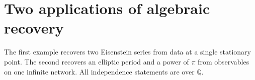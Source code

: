 \documentclass[11pt,a4paper]{article}
\theoremstyle{definition}\newtheorem{definition}[theorem]{Definition}\newtheorem{example}[theorem]{Example}
\theoremstyle{remark}\newtheorem{remark}[theorem]{Remark}
\newcommand{\Q}{\mathbb Q}\newcommand{\Z}{\mathbb Z}\newcommand{\R}{\mathbb R}\newcommand{\N}{\mathbb N}
\begin{document}

\section{Two applications of algebraic recovery}\label{sec:period-examples}
The first example recovers two Eisenstein series from data at a single
stationary point. The second recovers an elliptic period and a power of
$\pi$ from observables on one infinite network. All independence statements
are over $\Q$.
\end{document}
